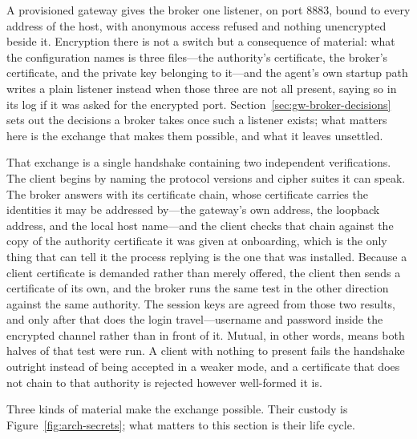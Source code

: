\documentclass[12pt,a4paper]{report}
\begin{document}
A provisioned gateway gives the broker one listener, on port 8883, bound to
every address of the host, with anonymous access refused and nothing
unencrypted beside it. Encryption there is not a switch but a consequence of
material: what the configuration names is three files---the authority's
certificate, the broker's certificate, and the private key belonging to
it---and the agent's own startup path writes a plain listener instead when
those three are not all present, saying so in its log if it was asked for the
encrypted port. Section~\ref{sec:gw-broker-decisions} sets out the decisions
a broker takes once such a listener exists; what matters here is the exchange
that makes them possible, and what it leaves unsettled.

That exchange is a single handshake containing two independent
verifications. The client begins by naming the protocol versions and cipher
suites it can speak. The broker answers with its certificate chain, whose
certificate carries the identities it may be addressed by---the gateway's own
address, the loopback address, and the local host name---and the client
checks that chain against the copy of the authority certificate it was given
at onboarding, which is the only thing that can tell it the process replying
is the one that was installed. Because a client certificate is demanded
rather than merely offered, the client then sends a certificate of its own,
and the broker runs the same test in the other direction against the same
authority. The session keys are agreed from those two results, and only
after that does the login travel---username and password inside the
encrypted channel rather than in front of it. Mutual, in other words, means
both halves of that test were run. A client with nothing to present fails
the handshake outright instead of being accepted in a weaker mode, and a
certificate that does not chain to that authority is rejected however
well-formed it is.

Three kinds of material make the exchange possible. Their custody is
Figure~\ref{fig:arch-secrets}; what matters to this section is their life
cycle.
\end{document}
